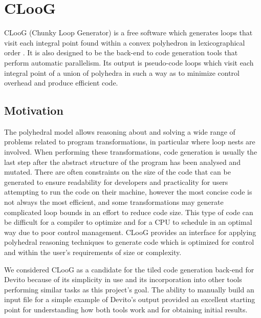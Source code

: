 \documentclass[a4paper,12pt,twoside]{report}
\begin{document}
\section{CLooG}
CLooG (Chunky Loop Generator) is a free software which generates loops that visit each integral
point found within a convex polyhedron in lexicographical order \cite{cloog}. It is also designed to be
the back-end to code generation tools that perform automatic parallelism. Its output is pseudo-code loops which visit
each integral point of a union of polyhedra in such a way as to minimize control overhead and produce efficient code.

\subsection{Motivation}
The polyhedral model allows reasoning about and solving a wide range of problems related to program transformations,
in particular where loop nests are involved. When performing these transformations, code generation is usually the last
step after the abstract structure of the program has been analysed and mutated. There are often constraints on the size of the code
that can be generated to ensure readability for developers and practicality for users attempting to run the code on their machine,
however the most concise code is not always the most efficient, and some transformations may generate complicated loop bounds in an effort
to reduce code size. This type of code can be difficult for a compiler to optimize and for a CPU to schedule in an optimal way due to
poor control management. CLooG provides an interface for applying polyhedral reasoning techniques to generate code which is optimized for control
and within the user's requirements of size or complexity.

We considered CLooG as a candidate for the tiled code generation back-end for Devito because of its simplicity in use and its incorporation into
other tools performing similar tasks as this project's goal. The ability to manually build an input file for a simple example of Devito's
output provided an excellent starting point for understanding how both tools work and for obtaining initial results.
\end{document}
